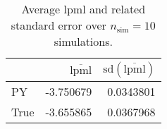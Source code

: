 \begin{table}[H]

\caption{Average lpml and related standard error over $n_{\text{sim}} = 10$ simulations.}
\centering
\begin{tabular}[t]{lrr}
\toprule
  & $\overbar{\text{lpml}}$ & $\text{sd}(\overbar{\text{lpml}})$\\
\midrule
PY & -3.750679 & 0.0343801\\
True & -3.655865 & 0.0367968\\
\bottomrule
\end{tabular}
\end{table}